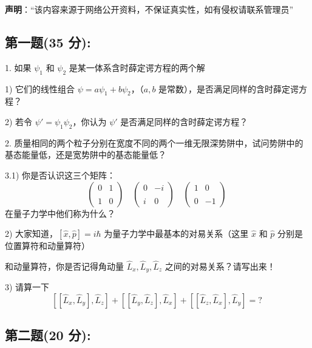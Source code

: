 
\textbf{声明}：“该内容来源于网络公开资料，不保证真实性，如有侵权请联系管理员”

\subsection{第一题(35 分):}
1. 如果 $\psi_1$ 和 $\psi_2$ 是某一体系含时薛定谔方程的两个解

1) 它们的线性组合 $\psi = a\psi_1 + b\psi_2$，（$a, b$ 是常数），是否满足同样的含时薛定谔方程？

2) 若令 $\psi' = \psi_1\psi_2$，你认为 $\psi'$ 是否满足同样的含时薛定谔方程？

2. 质量相同的两个粒子分别在宽度不同的两个一维无限深势阱中，试问势阱中的基态能量低，还是宽势阱中的基态能量低？

3.1) 你是否认识这三个矩阵：
\[\begin{pmatrix}0 & 1 \\\\1 & 0\end{pmatrix}\quad\begin{pmatrix}0 & -i \\\\i & 0\end{pmatrix}\quad\begin{pmatrix}1 & 0 \\\\0 & -1\end{pmatrix}~\]
在量子力学中他们称为什么？

2) 大家知道，$[\hat{x}, \hat{p}] = i\hbar$ 为量子力学中最基本的对易关系（这里 $\hat{x}$ 和 $\hat{p}$ 分别是位置算符和动量算符）

和动量算符，你是否记得角动量 $\hat{L}_x, \hat{L}_y, \hat{L}_z$ 之间的对易关系？请写出来！

3) 请算一下
\[[[\hat{L}_x, \hat{L}_y], \hat{L}_z] + [[\hat{L}_y, \hat{L}_z], \hat{L}_x] + [[\hat{L}_z, \hat{L}_x], \hat{L}_y] = ?~\]
\subsection{第二题(20 分):}